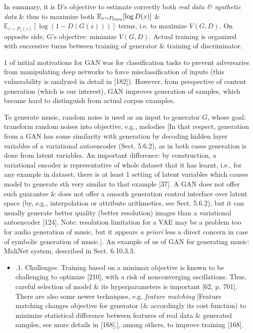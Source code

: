 \documentclass{article}
\begin{document}
\begin{itemize}
\begin{itemize}
		In summary, it is D's objective to estimate correctly both {\it real data \& synthetic data} \& thus to maximize both $\mathbb{E}_{x\sim P_{\rm Data}}[\log D(x)]$ \& $\mathbb{E}_{z\sim P_z(z)}[\log(1 - D(G(z)))]$ terms, i.e. to maximize $V(G,D)$. On opposite side, G's objective: minimize $V(G,D)$. Actual training is organized with successive turns between training of generator \& training of discriminator.
		
		1 of initial motivations for GAN was for classification tasks to prevent adversaries from manipulating deep networks to force misclassification of inputs (this vulnerability is analyzed in detail in [182]). However, from perspective of content generation (which is our interest), GAN improves generation of samples, which became hard to distinguish from actual corpus examples.
		
		To generate music, random noise is used as an input to generator $G$, whose goal: transform random noises into objective, e.g., melodies [In that respect, generation from a GAN has some similarity with generation by decoding hidden layer variables of a variational autoencoder (Sect. 5.6.2), as in both cases generation is done from latent variables. An important difference: by construction, a variational encoder is representative of whole dataset that it has learnt, i.e., for any example in dataset, there is at least 1 setting of latent variables which causes model to generate sth very similar to that example [37]. A GAN does not offer such guarantee \& does not offer a smooth generation control interface over latent space (by, e.g., interpolation or attribute arithmetics, see Sect. 5.6.2), but it can usually generate better quality (better resolution) images than a variational autoencoder [124]. Note: resolution limitation for a VAE may be a problem too for audio generation of music, but it appears {\it a priori} less a direct concern in case of symbolic generation of music.]. An example of us of GAN for generating music: MidiNet system, described in Sect. 6.10.3.3.
		\begin{itemize}
			\item {.1. Challenges.} Training based on a minimax objective is known to be challenging to optimize [210], with a risk of nonconverging oscillations. Thus, careful selection of model \& its hyperparameters is important [62, p. 701]. There are also some newer techniques, e.g. {\it feature matching} [Feature matching changes objective for generator (\& accordingly its cost function) to minimize statistical difference between features of real data \& generated samples, see more details in [168].], among others, to improve training [168].
			

\end{itemize}
\end{itemize}
\end{itemize}
\end{document}
